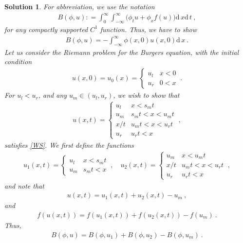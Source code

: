 \documentclass[10pt,letterpaper]{article}
\newcommand{\dif}[1][]{\mathrm{d} {#1}\,}
\newcommand{\rb}[1]{ \left(  {#1} \right) }
\newcommand{\frb}[1]{ \left(  {#1} \right) }
\theoremstyle{break}
\newtheorem{mysolution}{Solution}
\newtheorem*{mysolutioninformation}{Solution Information}
\newenvironment{solution}{\begin{mysolution}}{\end{mysolution}} \newenvironment{solutioninformation}{\begin{mysolutioninformation}}{\end{mysolutioninformation}}
\begin{document}
\begin{solution}
	For abbreviation, we use the notation
	\begin{gather}
		B\frb{\phi,u}: =\int_0^\infty \int_{-\infty}^\infty \Big(\phi_t u +\phi_x f(u)\Big)\dif x\dif t\ ,
	\end{gather}
	for any compactly supported $C^1$ function. Thus, we have to show
	\begin{gather} \label{WS}
		B\frb{\phi,u}=-\int_{-\infty}^\infty \phi(x,0)u(x,0)\dif x\ .
	\end{gather}
	Let us consider the Riemann problem for the Burgers equation, with the initial condition
	\begin{gather} 
		u(x,0)=u_0(x)=\begin{cases}
				u_l & x<0\\
				u_r & 0<x
			\end{cases}\ .
	\end{gather}
	For $u_l<u_r$, and any $u_m\in\rb{u_l,u_r}$, we wish to show that
	\begin{gather}
		u(x,t)=\begin{cases}
				u_l & x<s_mt\\
				u_m & s_mt<x<u_mt\\
				x/t & u_mt<x<u_rt\\
				u_r & u_rt<x
			\end{cases}\ ,
	\end{gather}
	satisfies \eqref{WS}. We first define the functions
	\begin{gather}
		u_1(x,t)=\begin{cases}
				u_l & x<s_mt\\
				u_m & s_mt<x
			\end{cases}\ ,
		\quad
		u_2(x,t)=\begin{cases}
				u_m & x<u_mt \\
				x/t & u_mt<x<u_rt\\
				u_r & u_rt<x
			\end{cases}\ ,
	\end{gather}
	and note that
	\begin{gather}
		u(x,t)=u_1(x,t)+u_2(x,t)-u_m\ ,
	\end{gather}
	and
	\begin{gather} \label{fsum}
		f\frb{u(x,t)}=f\frb{u_1(x,t)}+f\frb{u_2(x,t)}-f\frb{u_m}\ .
	\end{gather}
	Thus,
	\begin{gather} \label{Bsum}
		B\frb{\phi,u}=B\frb{\phi,u_1}+B\frb{\phi,u_2}-B\frb{\phi,u_m}\ .
	\end{gather}

\end{solution}
\end{document}
